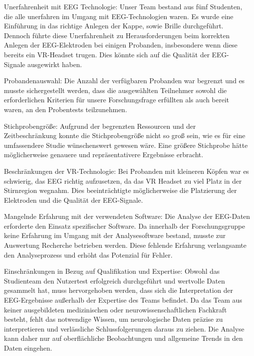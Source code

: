 \documentclass[conference]{IEEEtran}
\begin{document}
\begin{myitemize}
	\item Unerfahrenheit mit EEG Technologie: Unser Team bestand aus fünf Studenten, die alle unerfahren im Umgang mit EEG-Technologien waren. Es wurde eine Einführung in das richtige Anlegen der Kappe, sowie Brille durchgeführt. Dennoch führte diese Unerfahrenheit zu Herausforderungen beim korrekten Anlegen der EEG-Elektroden bei einigen Probanden, insbesondere wenn diese bereits ein VR-Headset trugen. Dies könnte sich auf die Qualität der EEG-Signale ausgewirkt haben.
	\item Probandenauswahl: Die Anzahl der verfügbaren Probanden war begrenzt und es musste sichergestellt werden, dass die ausgewählten Teilnehmer sowohl die erforderlichen Kriterien für unsere Forschungsfrage erfüllten als auch bereit waren, an den Probentests teilzunehmen.
	\item Stichprobengröße: Aufgrund der begrenzten Ressourcen und der Zeitbeschränkung konnte die Stichprobengröße nicht so groß sein, wie es für eine umfassendere Studie wünschenswert gewesen wäre. Eine größere Stichprobe hätte möglicherweise genauere und repräsentativere Ergebnisse erbracht.
	\item Beschränkungen der VR-Technologie: Bei Probanden mit kleineren Köpfen war es schwierig, das EEG richtig aufzusetzen, da das VR Headset zu viel Platz in der Stirnregion wegnahm. Dies beeinträchtigte möglicherweise die Platzierung der Elektroden und die Qualität der EEG-Signale.
	\item Mangelnde Erfahrung mit der verwendeten Software: Die Analyse der EEG-Daten erforderte den Einsatz spezifischer Software. Da innerhalb der Forschungsgruppe keine Erfahrung im Umgang mit der Analysesoftware bestand, musste zur Auswertung Recherche betrieben werden. Diese fehlende Erfahrung verlangsamte den Analyseprozess und erhöht das Potenzial für Fehler.
    \item Einschränkungen in Bezug auf Qualifikation und Expertise:
    Obwohl das Studienteam den Nutzertest erfolgreich durchgeführt und wertvolle Daten gesammelt hat, muss hervorgehoben werden, dass sich die Interpretation der EEG-Ergebnisse außerhalb der Expertise des Teams befindet. Da das Team aus keiner ausgebildeten medizinischen oder neurowissenschaftlichen Fachkraft besteht, fehlt das notwendige Wissen, um neurologische Daten präzise zu interpretieren und verlässliche Schlussfolgerungen daraus zu ziehen. Die Analyse kann daher nur auf oberflächliche Beobachtungen und allgemeine Trends in den Daten eingehen.


\end{myitemize}
\end{document}
